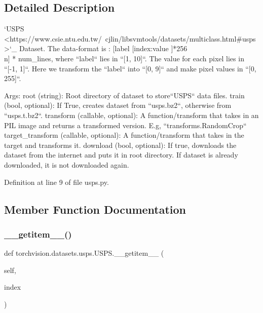 \subsection{Detailed Description}
\begin{DoxyVerb}`USPS <https://www.csie.ntu.edu.tw/~cjlin/libsvmtools/datasets/multiclass.html#usps>`_ Dataset.
The data-format is : [label [index:value ]*256 \\n] * num_lines, where ``label`` lies in ``[1, 10]``.
The value for each pixel lies in ``[-1, 1]``. Here we transform the ``label`` into ``[0, 9]``
and make pixel values in ``[0, 255]``.

Args:
    root (string): Root directory of dataset to store``USPS`` data files.
    train (bool, optional): If True, creates dataset from ``usps.bz2``,
        otherwise from ``usps.t.bz2``.
    transform (callable, optional): A function/transform that  takes in an PIL image
        and returns a transformed version. E.g, ``transforms.RandomCrop``
    target_transform (callable, optional): A function/transform that takes in the
        target and transforms it.
    download (bool, optional): If true, downloads the dataset from the internet and
        puts it in root directory. If dataset is already downloaded, it is not
        downloaded again.\end{DoxyVerb}
 

Definition at line 9 of file usps.\+py.



\subsection{Member Function Documentation}
\mbox{\label{classtorchvision_1_1datasets_1_1usps_1_1USPS_acfed13e69964e378fe59421a91e9e5c2}} 
\subsubsection{\texorpdfstring{\+\_\+\+\_\+getitem\+\_\+\+\_\+()}{\_\_getitem\_\_()}}
{\footnotesize\ttfamily def torchvision.\+datasets.\+usps.\+U\+S\+P\+S.\+\_\+\+\_\+getitem\+\_\+\+\_\+ (\begin{DoxyParamCaption}\item[{}]{self,  }\item[{}]{index }\end{DoxyParamCaption})}

